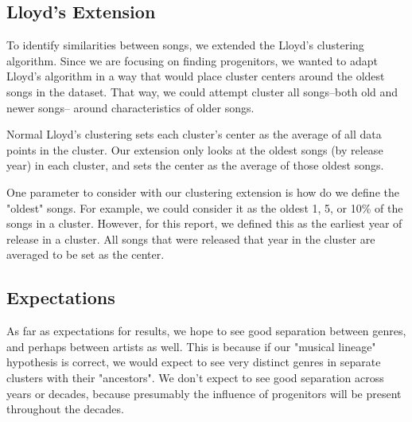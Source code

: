 \subsection{Lloyd's Extension}

To identify similarities between songs, we extended the Lloyd's clustering algorithm.
Since we are focusing on finding progenitors, we wanted to adapt Lloyd's algorithm
in a way that would place cluster centers around the oldest songs in the dataset.
That way, we could attempt cluster all songs--both old and newer songs--
around characteristics of older songs.

Normal Lloyd's clustering sets each cluster's center as the average of all data points in the cluster.
Our extension only looks at the oldest songs (by release year) in each cluster,
and sets the center as the average of those oldest songs.

One parameter to consider with our clustering extension is how do we define the "oldest" songs.
For example, we could consider it as the oldest 1, 5, or 10\% of the songs in a cluster.
However, for this report, we defined this as the earliest year of release in a cluster.
All songs that were released that year in the cluster are averaged to be set as the center.

\subsection{Expectations}

As far as expectations for results, we hope to see good separation between genres,
and perhaps between artists as well.
This is because if our "musical lineage" hypothesis is correct,
we would expect to see very distinct genres in separate clusters with their "ancestors".
We don't expect to see good separation across years or decades,
because presumably the influence of progenitors will be present throughout the decades.
